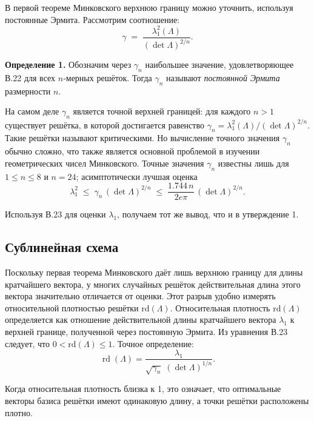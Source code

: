 В первой теореме Минковского верхнюю границу можно уточнить, используя
постоянные Эрмита. Рассмотрим соотношение:
\begin{equation}
\gamma \;=\;
\frac{\lambda_{1}^{2}(\Lambda)}{(\det\Lambda)^{2/n}}.
\end{equation}

\textbf{Определение 1.} Обозначим через $\gamma_{n}$ наибольшее значение,
удовлетворяющее В.22 для всех $n$‑мерных решёток. Тогда $\gamma_{n}$ называют
\textit{постоянной Эрмита} размерности $n$.

На самом деле $\gamma_{n}$ является точной верхней границей: для каждого $n>1$
существует решётка, в которой достигается равенство
$\gamma_{n}=\lambda_{1}^{2}(\Lambda)/(\det\Lambda)^{2/n}$. Такие решётки
называют критическими. Но вычисление точного значения $\gamma_{n}$ обычно
сложно, что также является основной проблемой в изучении геометрических чисел
Минковского. Точные значения $\gamma_{n}$ известны лишь для $1\le n\le8$ и
$n=24$; асимптотически лучшая оценка \cite{cite_43}
\begin{equation}
\lambda_{1}^{2}
\;\le\;
\gamma_{n}\,(\det\Lambda)^{2/n}
\;\le\;
\frac{1.744\,n}{2e\pi}\,(\det\Lambda)^{2/n}.
\end{equation}

Используя В.23 для оценки $\lambda_{1}$, получаем тот же вывод, что и в
утверждение 1.

\subsection*{Сублинейная схема}

Поскольку первая теорема Минковского даёт лишь верхнюю границу для длины
кратчайшего вектора, у многих случайных решёток действительная длина этого
вектора значительно отличается от оценки. Этот разрыв удобно измерять
относительной плотностью решётки rd$(\Lambda)$. Относительная плотность
rd$(\Lambda)$ определяется как отношение действительной длины кратчайшего
вектора $\lambda_{1}$ к верхней границе, полученной через постоянную Эрмита. Из
уравнения В.23 следует, что $0<\text{rd}(\Lambda)\le1$. Точное определение:
\begin{equation}
\operatorname{rd}(\Lambda)
  = \frac{\lambda_{1}}{\sqrt{\gamma_{n}}\;(\det\Lambda)^{1/n}}.
\end{equation}

Когда относительная плотность близка к 1, это означает, что оптимальные векторы
базиса решётки имеют одинаковую длину, а точки решётки расположены плотно.

